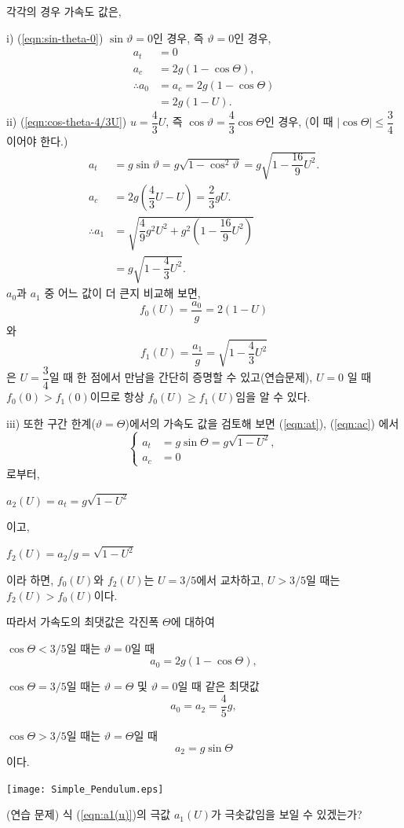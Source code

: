 \documentclass[a4paper, twocolumn]{article}
\begin{document}
각각의 경우 가속도 값은,\par

i)  (\ref{eqn:sin-theta-0}) $\sin\vartheta = 0$인 경우, 즉 $\vartheta=0$인 경우,
\begin{align}
a_t&=0\nonumber\\
a_c&=2g(1-\cos\Theta),\nonumber\\
\therefore a_0 &= a_c=2g(1-\cos\Theta)\nonumber\\
             &=2g(1-U).
\end{align}
ii) (\ref{eqn:cos-theta-4/3U}) $u=\dfrac{4}{3}U$, 즉 $\cos\vartheta = \dfrac{4}{3}\cos\Theta$인 경우, (이 때 $\left|\cos\Theta\right|\le\dfrac{3}{4}$이어야 한다.)
\begin{align}
a_t &= g\sin\vartheta=g\sqrt{1-\cos^2\vartheta}=g\sqrt{1-\dfrac{16}{9}U^2}.\nonumber\\
a_c &= 2g\left(\dfrac{4}{3}U-U\right)= \dfrac{2}{3}gU.\nonumber\\
\therefore a_1 &= \sqrt{\dfrac{4}{9}g^2U^2 + g^2\left(1-\dfrac{16}{9}U^2\right)}\nonumber\\
             &= g\sqrt{1-\dfrac{4}{3}U^2}.\label{eqn:a1(u)}
\end{align}
$a_0$과 $a_1$ 중 어느 값이 더 큰지 비교해 보면,
$$ f_0(U)=\dfrac{a_0}{g}=2(1-U) $$와 $$ f_1(U)=\dfrac{a_1}{g}=\sqrt{1-\dfrac{4}{3}U^2} $$은 $U=\dfrac{3}{4}$일 때 한 점에서 만남을 간단히 증명할 수 있고(연습문제), $ U=0 $ 일 때 $f_0(0) > f_1(0)$이므로 항상 $f_0(U)\ge{}f_1(U)$임을 알 수 있다.\par
iii) 또한 구간 한계($\vartheta=\Theta$)에서의 가속도 값을 검토해 보면 (\ref{eqn:at}), (\ref{eqn:ac}) 에서
\[\left\{
\begin{array}{rl}
a_t &= g\sin\Theta=g\sqrt{1-U^2},\\
a_c &= 0
\end{array}
\right.\]
로부터,\par
\hfill $ a_2(U)=a_t=g\sqrt{1-U^2} $\hfill\,\par
이고,\par
\hfill $ f_2(U)=a_2/g=\sqrt{1-U^2} $\hfill\,\par
이라 하면, $ f_0(U) $와 $f_2(U)$는 $U=3/5$에서 교차하고, $U>3/5$일 때는 $f_2(U)>f_0(U)$이다.\par

따라서 가속도의 최댓값은 각진폭  $\Theta$에 대하여 \par
$\cos\Theta<3/5$일 때는 $\vartheta=0$일 때 $$ a_0=2g(1-\cos\Theta), $$\par $\cos\Theta=3/5$일 때는 $\vartheta=\Theta$ 및 $\vartheta=0$일 때 같은 최댓값 $$ a_0=a_2=\dfrac{4}{5}g, $$\par
$\cos\Theta>3/5$일 때는 $\vartheta=\Theta$일 때 $$ a_2=g\sin\Theta $$이다.\par
\hfill \texttt{[image: Simple\_Pendulum.eps]} \hfill\,\par
(연습 문제) 식 (\ref{eqn:a1(u)})의 극값 $a_1(U)$가 극솟값임을 보일 수 있겠는가? 
\end{document}
